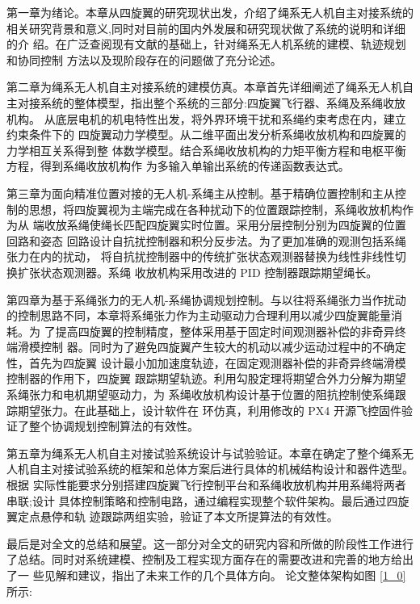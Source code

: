 \documentclass[lang=chs, degree=master, blindreview=false, winfonts=true]{yanputhesis}
\begin{document}
第一章为绪论。本章从四旋翼的研究现状出发，介绍了绳系无人机自主对接系统的 相关研究背景和意义,同时对目前的国内外发展和研究现状做了系统的说明和详细的介 绍。在广泛查阅现有文献的基础上，针对绳系无人机系统的建模、轨迹规划和协同控制 方法以及现阶段存在的问题做了充分论述。

第二章为绳系无人机自主对接系统的建模仿真。本章首先详细阐述了绳系无人机自主对接系统的整体模型，指出整个系统的三部分:四旋翼飞行器、系绳及系绳收放机构。 从底层电机的机电特性出发，将外界环境干扰和系绳约束考虑在内，建立约束条件下的 四旋翼动力学模型。从二维平面出发分析系绳收放机构和四旋翼的力学相互关系得到整 体数学模型。结合系绳收放机构的力矩平衡方程和电枢平衡方程，得到系绳收放机构作 为多输入单输出系统的传递函数表达式。

第三章为面向精准位置对接的无人机-系绳主从控制。基于精确位置控制和主从控 制的思想，将四旋翼视为主端完成在各种扰动下的位置跟踪控制，系绳收放机构作为从 端收放系绳使绳长匹配四旋翼实时位置。采用分层控制分别为四旋翼的位置回路和姿态 回路设计自抗扰控制器和积分反步法。为了更加准确的观测包括系绳张力在内的扰动， 将自抗扰控制器中的传统扩张状态观测器替换为线性非线性切换扩张状态观测器。系绳 收放机构采用改进的 PID 控制器跟踪期望绳长。

第四章为基于系绳张力的无人机-系绳协调规划控制。与以往将系绳张力当作扰动 的控制思路不同，本章将系绳张力作为主动驱动力合理利用以减少四旋翼能量消耗。为 了提高四旋翼的控制精度，整体采用基于固定时间观测器补偿的非奇异终端滑模控制 器。同时为了避免四旋翼产生较大的机动以减少运动过程中的不确定性，首先为四旋翼 设计最小加加速度轨迹，在固定观测器补偿的非奇异终端滑模控制器的作用下，四旋翼 跟踪期望轨迹。利用勾股定理将期望合外力分解为期望系绳张力和电机期望驱动力，为 系绳收放机构设计基于位置的阻抗控制使系绳跟踪期望张力。在此基础上，设计软件在 环仿真，利用修改的 PX4 开源飞控固件验证了整个协调规划控制算法的有效性。

第五章为绳系无人机自主对接试验系统设计与试验验证。本章在确定了整个绳系无 人机自主对接试验系统的框架和总体方案后进行具体的机械结构设计和器件选型。根据 实际性能要求分别搭建四旋翼飞行控制平台和系绳收放机构并用系绳将两者串联;设计 具体控制策略和控制电路，通过编程实现整个软件架构。最后通过四旋翼定点悬停和轨 迹跟踪两组实验，验证了本文所提算法的有效性。

最后是对全文的总结和展望。这一部分对全文的研究内容和所做的阶段性工作进行 了总结。同时对系统建模、控制及工程实现方面存在的需要改进和完善的地方给出了一 些见解和建议，指出了未来工作的几个具体方向。
论文整体架构如图 \ref{1_0} 所示:
\end{document}
